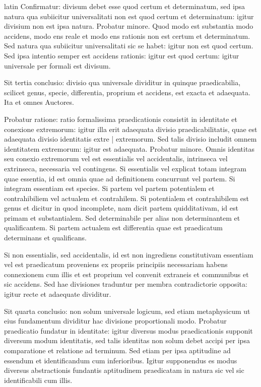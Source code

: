 \begin{otherlanguage*}{latin}
\pstart
Confirmatur:
divisum debet esse quod certum et determinatum, sed ipsa natura qua subiicitur universalitati non est quod certum et determinatum:
igitur divisium non est ipsa natura. Probatur minore. Quod modo est substantia modo accidens, modo ens reale et modo ens rationis non est certum et determinatum. Sed natura qua subiicitur universalitati sic se habet:
igitur non est quod certum. Sed ipsa intentio semper est accidens rationis:
igitur est quod certum:
igitur universale per formali est divisum. 
\pend

\pstart
Sit tertia conclusio:
divisio qua universale dividitur in quinque praedicabilia, scilicet genus, specie, differentia, proprium et accidens, est exacta et adaequata. Ita  et omnes Auctores. 
\pend

\pstart
Probatur ratione:
ratio formalissima praedicationis consistit in identitate et conexione extremorum:
igitur illa erit adaequata divisio praedicabilitatis, quae est adaequata divisio identitatis extre \textnormal{|} extremorum. Sed talis divisio includit omnem identitatem extremorum:
igitur est adaequata. Probatur minore. Omnis identitas seu conexio extremorum vel est essentialis vel accidentalis, intrinseca vel extrinseca, necessaria vel contingens. Si essentialis vel explicat totam integram quae essentia, id est omnia quae ad definitionem concurrunt vel partem. Si integram essentiam est species. Si partem vel partem potentialem et contrahibiliem vel actualem et contrahilem. Si potentialem et contrahibilem est genus et dicitur in quod incomplete, nam dicit partem quidditativam, id est primam et substantialem. Sed determinabile per alias non determinantem et qualificantem. Si partem actualem est differentia quae est praedicatum determinans et qualificans. 
\pend

\pstart
Si non essentialis, sed accidentalis, id est non ingrediens constitutivam essentiam vel est praedicatum proveniens ex propriis principiis necessariam habens connexionem cum illis et est proprium vel convenit extraneis et communibus et sic accidens. Sed hae divisiones traduntur per membra contradictorie opposita:
igitur recte et adaequate dividitur. 
\pend

\pstart
Sit quarta conclusio:
non solum universale logicum, sed etiam metaphysicum ut eius fundamentum dividitur hac divisione proportionali modo. Probatur praedicatio fundatur in identitate:
igitur diversus modus praedicationis supponit diversum modum identitatis, sed talis identitas non solum debet accipi per ipsa comparatione et relatione ad terminum. Sed etiam per ipsa aptitudine ad essendum et identificandum cum inferioribus. Igitur supponendus es modus diversus abstractionis fundantis aptitudinem praedicatam in natura sic vel sic identificabili cum illis. 
\pend


\end{otherlanguage*}
